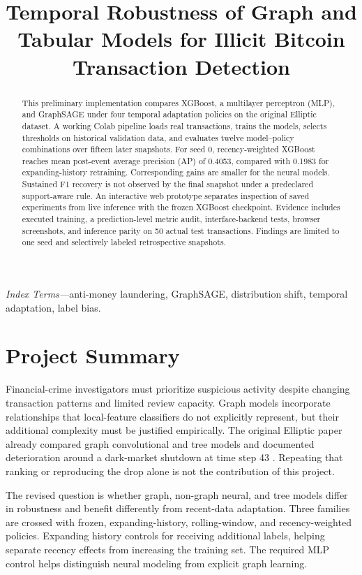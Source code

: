 \documentclass[conference]{IEEEtran}
\title{Temporal Robustness of Graph and Tabular Models for Illicit Bitcoin Transaction Detection}
\author{\IEEEauthorblockN{Alex (GitHub: alexchooys)}
\IEEEauthorblockA{Applied Data Science, University of Florida\\\url{https://github.com/alexchooys}}}
\begin{document}
\maketitle
\begin{abstract}
This preliminary implementation compares XGBoost, a multilayer perceptron (MLP), and GraphSAGE under four temporal adaptation policies on the original Elliptic dataset. A working Colab pipeline loads real transactions, trains the models, selects thresholds on historical validation data, and evaluates twelve model--policy combinations over fifteen later snapshots. For seed 0, recency-weighted XGBoost reaches mean post-event average precision (AP) of 0.4053, compared with 0.1983 for expanding-history retraining. Corresponding gains are smaller for the neural models. Sustained F1 recovery is not observed by the final snapshot under a predeclared support-aware rule. An interactive web prototype separates inspection of saved experiments from live inference with the frozen XGBoost checkpoint. Evidence includes executed training, a prediction-level metric audit, interface-backend tests, browser screenshots, and inference parity on 50 actual test transactions. Findings are limited to one seed and selectively labeled retrospective snapshots.
\end{abstract}
\noindent\textit{Index Terms---}anti-money laundering, GraphSAGE, distribution shift, temporal adaptation, label bias.

\section{Project Summary}
Financial-crime investigators must prioritize suspicious activity despite changing transaction patterns and limited review capacity. Graph models incorporate relationships that local-feature classifiers do not explicitly represent, but their additional complexity must be justified empirically. The original Elliptic paper already compared graph convolutional and tree models and documented deterioration around a dark-market shutdown at time step 43 \cite{weber}. Repeating that ranking or reproducing the drop alone is not the contribution of this project.

The revised question is whether graph, non-graph neural, and tree models differ in robustness and benefit differently from recent-data adaptation. Three families are crossed with frozen, expanding-history, rolling-window, and recency-weighted policies. Expanding history controls for receiving additional labels, helping separate recency effects from increasing the training set. The required MLP control helps distinguish neural modeling from explicit graph learning.
\end{document}
